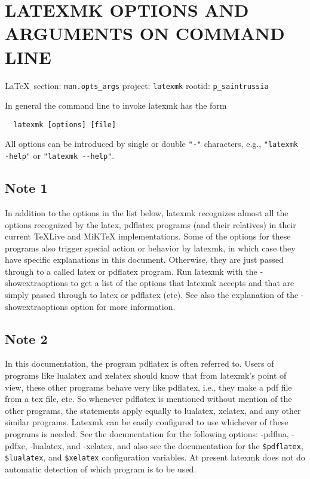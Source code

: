  
 

\section{LATEXMK OPTIONS AND ARGUMENTS ON COMMAND LINE}
  
\vspace{0.5cm}
 {\ifDEBUG\small\LaTeX~section: \verb|man.opts_args| project: \verb|latexmk| rootid: \verb|p_saintrussia| \fi}
\vspace{0.5cm}

In general the command line to invoke latexmk has the form

\begin{verbatim}
  latexmk [options] [file]
\end{verbatim}

All options can be introduced by single or double \verb|"-"| characters, e.g.,
\verb|"latexmk -help"| or \verb|"latexmk --help"|.

\subsection{Note 1}

In addition to the options in the list  below,  latexmk  recognizes almost
all the options recognized by the latex, pdflatex programs (and their
relatives) in their current TeXLive and  MiKTeX  implementations.  Some of
the options for these programs also trigger special action or behavior by
latexmk, in which case they have specific  explanations  in  this document.
Otherwise, they are just passed through to a called latex or pdflatex program.
Run latexmk  with  the  -showextraoptions  to  get  a list of the options
that latexmk accepts and that are simply passed through to latex or pdflatex
(etc).  See also the  explanation of the -showextraoptions option for more
information.

\subsection{Note 2}

In this documentation, the program pdflatex is often referred to.
Users of programs like lualatex and xelatex should know that  from latexmk's
point  of view, these other programs behave very like pdflatex, i.e., they
make a pdf file from a  tex  file,  etc.   So  whenever pdflatex is mentioned
without mention of the other programs, the statements apply equally to
lualatex, xelatex, and any  other  similar  programs.  Latexmk can be easily
configured to use whichever of these programs is needed.  See the
documentation  for  the  following  options: -pdflua,  -pdfxe,  -lualatex, and
-xelatex, and also see the documentation for the \verb|$pdflatex|,
\verb|$lualatex|,  and  \verb|$xelatex|  configuration  variables.   At
present  latexmk  does not do automatic detection of which program is to be
used.



